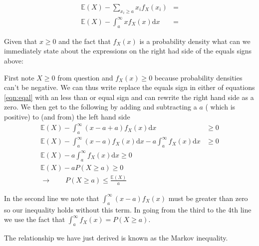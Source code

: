 \documentclass[paper=a4, fontsize=11pt]{scrartcl}
\newcommand{\red}[1]{{\color{red}#1}}
\numberwithin{equation}{section}
\numberwithin{figure}{section}
\numberwithin{table}{section}
\begin{document}
\begin{equation}
\begin{aligned}
 \mathbb{E}(X) - \sum_{x_i \ge a} x_i f_X(x_i) &= \\
 \mathbb{E}(X) - \int_a^{\infty} x f_X(x) \textrm{d}x &= 
 \end{aligned}
 \label{eqn:eqal}
 \end{equation}


\noindent Given that $x \ge 0$ and the fact that $f_X(x)$ is a probability
density what can we immediately state about the expressions on the right had
side of the equals signs above: 

\begin{questions}
\vspace{9cm}
\end{questions}

\begin{answers}
\red{
\vspace{0.25cm}
First note $X\ge 0$ from question and $f_X(x) \ge 0$ because probability
densities can't be negative. 
We can thus write replace the equals sign in either of equations \ref{eqn:eqal}
with an less than or equal sign and
can rewrite the right hand side as a zero.  We then get to the following by
adding and subtracting a $a$ ( which is positive) to (and from) the left hand
side
\begin{equation}
\begin{aligned}
\mathbb{E}(X) - \int_a^\infty ( x - a + a ) f_X(x) \textrm{d}x & \ge 0  \\
\mathbb{E}(X) - \int_a^\infty ( x - a ) f_X(x)  \textrm{d}x  - a \int_a^\infty
f_X(x) \textrm{d}x & \ge 0 \\ 
\mathbb{E}(X) - a \int_a^\infty f_X(x) \textrm{d}x \ge 0 \\
\mathbb{E}(X) - a P(X \ge a ) \ge 0 \\
\rightarrow \qquad P(X\ge a ) \le \frac{\mathbb{E}(X)}{a}
\end{aligned}
\end{equation}

In the second line we note that $\int_a^\infty ( x - a ) f_X(x)$ must be greater
than zero so
our inequality holds without this term.  In going from the third to the 4th line
we use the fact that 
$\int_a^\infty f_X(x) = P(X\ge a )$. 
}
\vspace{0.25cm}
\end{answers}

\noindent The relationship we have just derived is known as the Markov
inequality.
\end{document}
